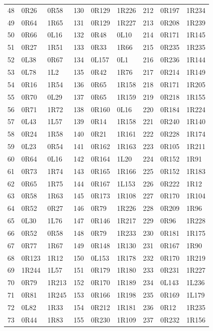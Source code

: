 \begin{longtable}{@{}rll@{\hspace{8mm}}rll@{\hspace{8mm}}rll@{}}
48 & 0R26 & 0R58 & 130 & 0R129 & 1R226 & 212 & 0R197 & 1R234\\
49 & 0R64 & 1R65 & 131 & 0R129 & 1R227 & 213 & 0R208 & 1R239\\
50 & 0R66 & 0L16 & 132 & 0R48 & 0L10 & 214 & 0R171 & 1R145\\
51 & 0R27 & 1R51 & 133 & 0R33 & 1R66 & 215 & 0R235 & 1R235\\
52 & 0L38 & 0R67 & 134 & 0L157 & 0L1 & 216 & 0R236 & 1R144\\
53 & 0L78 & 1L2 & 135 & 0R42 & 1R76 & 217 & 0R214 & 1R149\\
54 & 0R16 & 1R54 & 136 & 0R65 & 1R158 & 218 & 0R171 & 1R205\\
55 & 0R70 & 0L29 & 137 & 0R65 & 1R159 & 219 & 0R218 & 1R155\\
56 & 0R71 & 1R72 & 138 & 0R160 & 0L16 & 220 & 0R184 & 1R224\\
57 & 0L43 & 1L57 & 139 & 0R14 & 1R158 & 221 & 0R240 & 1R140\\
58 & 0R24 & 1R58 & 140 & 0R21 & 1R161 & 222 & 0R228 & 1R174\\
59 & 0L23 & 0R54 & 141 & 0R162 & 1R163 & 223 & 0R105 & 1R211\\
60 & 0R64 & 0L16 & 142 & 0R164 & 1L20 & 224 & 0R152 & 1R91\\
61 & 0R73 & 1R74 & 143 & 0R165 & 1R166 & 225 & 0R152 & 1R183\\
62 & 0R65 & 1R75 & 144 & 0R167 & 1L153 & 226 & 0R222 & 1R12\\
63 & 0R58 & 1R63 & 145 & 0R173 & 1R108 & 227 & 0R170 & 1R104\\
64 & 0R52 & 0R27 & 146 & 0R79 & 1R226 & 228 & 0R209 & 1R96\\
65 & 0L30 & 1L76 & 147 & 0R146 & 1R217 & 229 & 0R96 & 1R228\\
66 & 0R52 & 0R58 & 148 & 0R79 & 1R233 & 230 & 0R181 & 1R175\\
67 & 0R77 & 1R67 & 149 & 0R148 & 1R130 & 231 & 0R167 & 1R90\\
68 & 0R123 & 1R12 & 150 & 0L153 & 1R178 & 232 & 0R170 & 1R219\\
69 & 1R244 & 1L57 & 151 & 0R179 & 1R180 & 233 & 0R231 & 1R227\\
70 & 0R79 & 1R213 & 152 & 0R170 & 1R189 & 234 & 0L143 & 1L236\\
71 & 0R81 & 1R245 & 153 & 0R166 & 1R198 & 235 & 0R169 & 1L179\\
72 & 0L82 & 1R33 & 154 & 0R212 & 1R181 & 236 & 0R12 & 1R235\\
73 & 0R44 & 1R83 & 155 & 0R230 & 1R109 & 237 & 0R232 & 1R156\\

\end{longtable}
